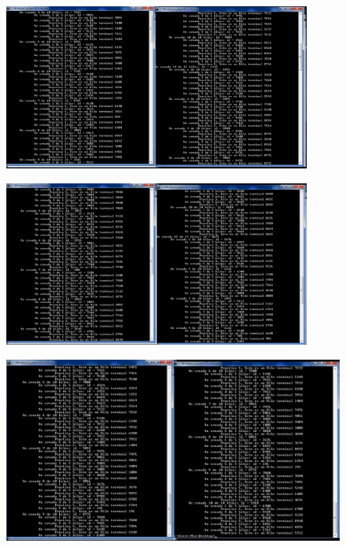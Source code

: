 \documentclass[12pt]{article}
\begin{document}
\begin{itemize}
    	       \begin{figure}[h!]
			          \centering
			         \includegraphics[width=0.9\textwidth]{Practica5/Images/windows/5_1.png}
			         \end{figure} 
\begin{figure}[h!]
			          \centering
			         \includegraphics[width=0.9\textwidth]{Practica5/Images/windows/5_2.png}
			         \end{figure} 
\begin{figure}[h!]
			          \centering
			         \includegraphics[width=\textwidth]{Practica5/Images/windows/5_3.png}
			         \end{figure}
    	        

\end{itemize}
\end{document}

